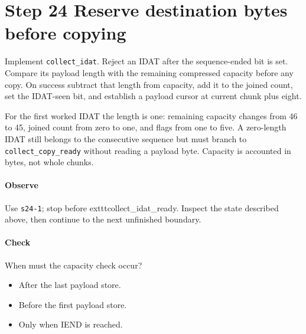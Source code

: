 \section{Step 24 Reserve destination bytes before copying}\label{png-collect-s24}
Implement \texttt{collect\_idat}. Reject an IDAT after the sequence-ended bit is set. Compare its payload length with the remaining compressed capacity before any copy. On success subtract that length from capacity, add it to the joined count, set the IDAT-seen bit, and establish a payload cursor at current chunk plus eight.

For the first worked IDAT the length is one: remaining capacity changes from 46 to 45, joined count from zero to one, and flags from one to five. A zero-length IDAT still belongs to the consecutive sequence but must branch to \texttt{collect\_copy\_ready} without reading a payload byte. Capacity is accounted in bytes, not whole chunks.

\paragraph{Observe} Use \texttt{s24-1}; stop before 	exttt{collect\_idat\_ready}. Inspect the state described above, then continue to the next unfinished boundary.

\paragraph{Check} When must the capacity check occur?
\begin{itemize}
\item[A.] After the last payload store.
\item[B.] Before the first payload store.
\item[C.] Only when IEND is reached.
\end{itemize}
